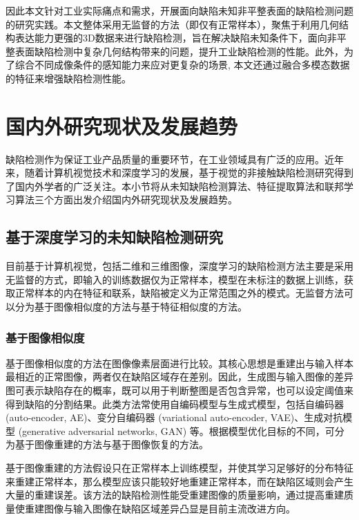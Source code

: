 因此本文针对工业实际痛点和需求，开展面向缺陷未知非平整表面的缺陷检测问题的研究实践。本文整体采用无监督的方法（即仅有正常样本），聚焦于利用几何结构表达能力更强的3D数据来进行缺陷检测，旨在解决缺陷未知条件下，面向非平整表面缺陷检测中复杂几何结构带来的问题，提升工业缺陷检测的性能。此外，为了综合不同成像条件的感知能力来应对更复杂的场景, 本文还通过融合多模态数据的特征来增强缺陷检测性能。

\section{国内外研究现状及发展趋势}
缺陷检测作为保证工业产品质量的重要环节，在工业领域具有广泛的应用。近年来，随着计算机视觉技术和深度学习的发展，基于视觉的非接触缺陷检测研究得到了国内外学者的广泛关注。本小节将从未知缺陷检测算法、特征提取算法和联邦学习算法三个方面出发介绍国内外研究现状及发展趋势。


\subsection{基于深度学习的未知缺陷检测研究}
目前基于计算机视觉，包括二维和三维图像，深度学习的缺陷检测方法主要是采用无监督的方式，即输入的训练数据仅为正常样本，模型在未标注的数据上训练，获取正常样本的内在特征和联系，缺陷被定义为正常范围之外的模式。无监督方法可以分为基于图像相似度的方法与基于特征相似度的方法。\cite{bergmannMVTec3DADDataset2022,chenSurfaceDefectDetection2021,zhengBenchmarkingUnsupervisedAnomaly2022,TaoXianJiYuShenDuXueXiDeBiaoMianQueXianJianCeFangFaZongShu2021a,luoGongyequexianjianceshenduxuexifangfazongshu2022}

\subsubsection{基于图像相似度}

基于图像相似度的方法在图像像素层面进行比较。其核心思想是重建出与输入样本最相近的正常图像，两者仅在缺陷区域存在差别。因此，生成图与输入图像的差异图可表示缺陷存在的概率，既可以用于判断整图是否包含异常，也可以设定阈值来得到缺陷的分割结果。此类方法常使用自编码模型与生成式模型，包括自编码器 (auto-encoder, AE)\cite{hintonAutoencodersMinimumDescription1993}、变分自编码器 (variational auto-encoder, VAE)\cite{kingmaAutoEncodingVariationalBayes2022}、生成对抗模型 (generative adversarial networks, GAN)\cite{hoGenerativeAdversarialImitation2016} 等。根据模型优化目标的不同，可分为基于图像重建的方法与基于图像恢复的方法。

基于图像重建的方法假设只在正常样本上训练模型，并使其学习足够好的分布特征来重建正常样本，那么模型应该只能较好地重建正常样本，而在缺陷区域则会产生大量的重建误差。该方法的缺陷检测性能受重建图像的质量影响，通过提高重建质量使重建图像与输入图像在缺陷区域差异凸显是目前主流改进方向。

